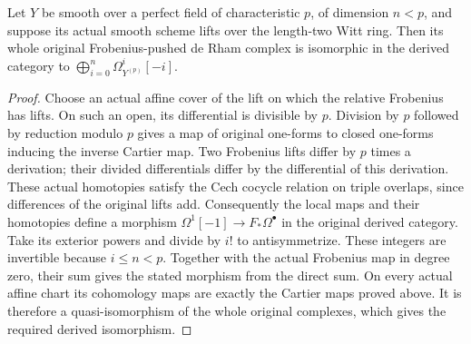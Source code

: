 \begin{lemma}
\label{lem:vanishing-deligne-illusie-splitting}
\notready
Let $Y$ be smooth over a perfect field of characteristic $p$, of dimension
$n<p$, and suppose its actual smooth scheme lifts over the length-two
Witt ring. Then its whole original Frobenius-pushed de Rham complex is
isomorphic in the derived category to
$\bigoplus_{i=0}^n\Omega^i_{Y^{(p)}}[-i]$.
\end{lemma}
\begin{proof}
Choose an actual affine cover of the lift on which the relative Frobenius
has lifts. On such an open, its differential is divisible by $p$.
Division by $p$ followed by reduction modulo $p$ gives a map of original
one-forms to closed one-forms inducing the inverse Cartier map. Two
Frobenius lifts differ by $p$ times a derivation; their divided
differentials differ by the differential of this derivation. These
actual homotopies satisfy the Cech cocycle relation on triple overlaps,
since differences of the original lifts add. Consequently the local
maps and their homotopies define a morphism
$\Omega^1[-1]\to F_*\Omega^\bullet$ in the original derived category.
Take its exterior powers and divide by $i!$ to antisymmetrize. These
integers are invertible because $i\le n<p$. Together with the actual
Frobenius map in degree zero, their sum gives the stated morphism from
the direct sum. On every actual affine chart its cohomology maps are
exactly the Cartier maps proved above. It is therefore a quasi-isomorphism
of the whole original complexes, which gives the required derived
isomorphism.
\end{proof}

